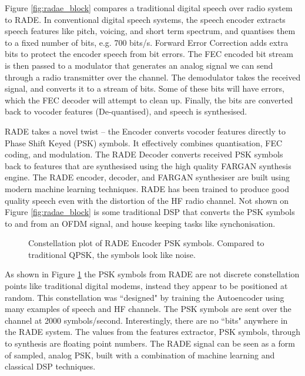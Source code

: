 \documentclass{article}
\begin{document}
Figure \ref{fig:radae_block} compares a traditional digital speech over radio system to RADE.
In conventional digital speech systems, the speech encoder extracts speech features like pitch, voicing, and short term spectrum, and quantises them to a fixed number of bits, e.g. 700 bits/s.  Forward Error Correction adds extra bits to protect the encoder speech from bit errors.  The FEC encoded bit stream is then passed to a modulator that generates an analog signal we can send through a radio transmitter over the channel.  The demodulator takes the received signal, and converts it to a stream of bits.  Some of these bits will have errors, which the FEC decoder will attempt to clean up.  Finally, the bits are converted back to vocoder features (De-quantised), and speech is synthesised.

RADE takes a novel twist – the Encoder converts vocoder features directly to Phase Shift Keyed (PSK) symbols. It effectively combines quantisation, FEC coding, and modulation.  The RADE Decoder converts received PSK symbols back to features that are synthesised using the high quality FARGAN synthesis engine. The RADE encoder, decoder, and FARGAN synthesiser are built using modern machine learning techniques.  RADE has been trained to produce good quality speech even with the distortion of the HF radio channel. Not shown on Figure \ref{fig:radae_block} is some traditional DSP that converts the PSK symbols to and from an OFDM signal, and house keeping tasks like synchonisation.

\begin{figure}[h]
\caption{Constellation plot of RADE Encoder PSK symbols.  Compared to traditional QPSK, the symbols look like noise.}
\label{fig:psk_scatter}
\begin{center}

\end{center}
\end{figure}

As shown in Figure \ref{fig:psk_scatter} the PSK symbols from RADE are not discrete constellation points like traditional digital modems, instead they appear to be positioned at random.  This constellation was ``designed" by training the Autoencoder using many examples of speech and HF channels. The PSK symbols are sent over the channel at 2000 symbols/second.  Interestingly, there are no ``bits" anywhere in the RADE system.  The values from the features extractor, PSK symbols, through to synthesis are floating point numbers. The RADE signal can be seen as a form of sampled, analog PSK, built with a combination of machine learning and classical DSP techniques.
\end{document}
